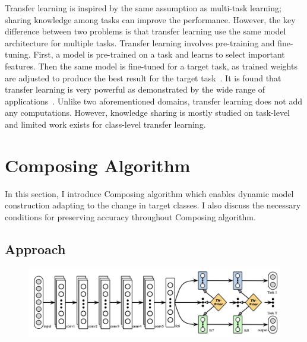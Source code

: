 \documentclass{article}
\begin{document}
Transfer learning is inspired by the same assumption as multi-task learning; sharing knowledge among tasks can improve the performance. However, the key difference between two problems is that transfer learning use the same model architecture for multiple tasks. Transfer learning involves pre-training and fine-tuning. First, a model is pre-trained on a task and learns to select important features. Then the same model is fine-tuned for a target task, as trained weights are adjusted to produce the best result for the target task~\cite{yosinski2014transferable}. It is found that transfer learning is very powerful as demonstrated by the wide range of applications~\cite{raina2007self, egan2004effects, glorot2011domain}. Unlike two aforementioned domains, transfer learning does not add any computations. However, knowledge sharing is mostly studied on task-level and limited work exists for class-level transfer learning.

\section{Composing Algorithm}

In this section, I introduce Composing algorithm which enables dynamic model construction adapting to the change in target classes. I also discuss the necessary conditions for preserving accuracy throughout Composing algorithm.

\subsection{Approach}

\begin{figure}[t!]
  \centering
  \includegraphics[scale=0.25,trim={0mm 0mm 0mm 0mm},clip]{long2017learning.png}
\end{figure}
\end{document}
